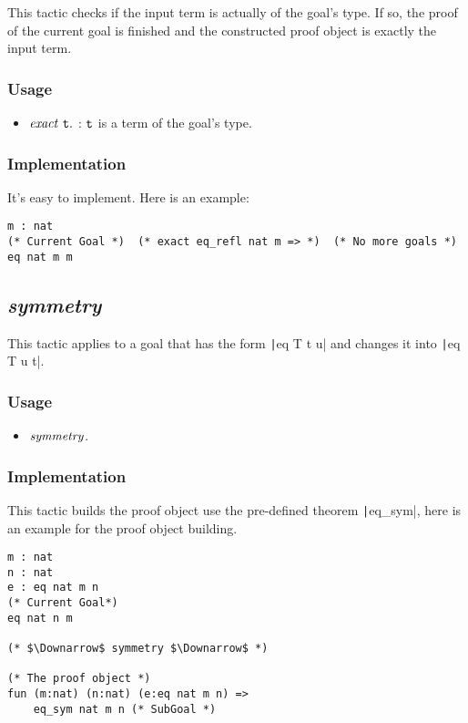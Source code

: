 This tactic checks if the input term is actually of the goal's type. If so, the proof of the current goal is finished and the 
constructed proof object is exactly the input term.

\subsubsection*{Usage}
\begin{itemize}
\item ${\it exact}\ \tt t.$ : $\tt t$ is a term of the goal's type. 
\end{itemize}

\subsubsection*{Implementation}
It's easy to implement. Here is an example:
\begin{center}
\begin{minipage}{0.8\textwidth}
\begin{verbatim}
m : nat                                                      
(* Current Goal *)  (* exact eq_refl nat m => *)  (* No more goals *)
eq nat m m                                       
\end{verbatim}
\end{minipage}
\end{center}


\subsection{\it symmetry}
This tactic applies to a goal that has the form \texttt|eq T t u| and changes it into \texttt|eq T u t|.

\subsubsection*{Usage}
\begin{itemize}
\item ${\it symmetry}$.
\end{itemize}

\subsubsection*{Implementation}
This tactic builds the proof object use the pre-defined theorem \texttt|eq_sym|, here is an example for the proof object building.
\begin{center}
\begin{minipage}{0.6\textwidth}
\begin{verbatim}
m : nat
n : nat
e : eq nat m n                    
(* Current Goal*)                              
eq nat n m                           

(* $\Downarrow$ symmetry $\Downarrow$ *)   

(* The proof object *)
fun (m:nat) (n:nat) (e:eq nat m n) =>   
    eq_sym nat m n (* SubGoal *)                                                
\end{verbatim}
\end{minipage}
\end{center}


